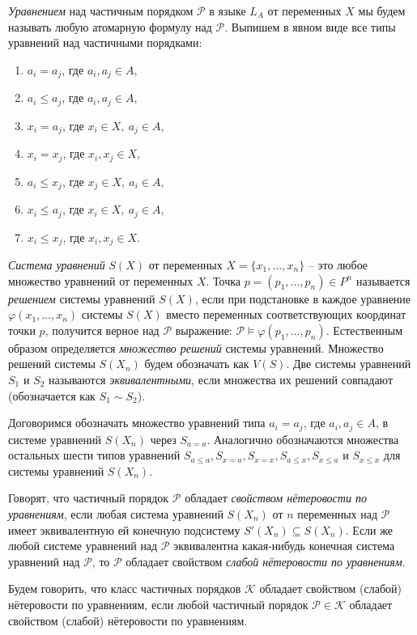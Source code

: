 \documentclass[12pt]{article}
\theoremstyle{break}
\def\P{\mathcal{P}}
\begin{document}
		\textit{Уравнением} над частичным порядком $\P$ в языке $L_A$ от переменных $X$ мы будем называть любую атомарную формулу над $\P$. Выпишем в явном виде все типы уравнений над частичными порядками:
		\begin{enumerate}
			\item $a_i=a_j$, где $a_i, a_j\in A$,
			\item $a_i\leqslant a_j$, где $a_i, a_j\in A$,
			\item $x_i=a_j$, где $x_i\in X,~a_j\in A$,
			\item $x_i=x_j$, где $x_i, x_j\in X$,
			\item $a_i\leqslant x_j$, где $x_j\in X,~a_i\in A$,
			\item $x_i\leqslant a_j$, где $x_i\in X,~a_j\in A$,
			\item $x_i\leqslant x_j$, где $x_i, x_j\in X$.
		\end{enumerate}

		\textit{Система уравнений} $S(X)$ от переменных $X=\{x_1,\dots,x_n\}$ -- это любое множество уравнений от переменных $X$. Точка $p=(p_1,\dots,p_n)\in P^n$ называется \textit{решением} системы уравнений $S(X)$, если при подстановке в каждое уравнение $\varphi(x_1,\dots,x_n)$ системы $S(X)$ вместо переменных соответствующих координат точки $p$, получится верное над $\P$ выражение: $\P\vDash \varphi(p_1,\dots,p_n)$. Естественным образом определяется \textit{множество решений} системы уравнений. Множество решений системы $S(X_n)$ будем обозначать как $V(S)$. Две системы уравнений $S_1$ и $S_2$ называются \textit{эквивалентными}, если множества их решений совпадают (обозначается как $S_1\sim S_2$).

		Договоримся обозначать множество уравнений типа $a_i=a_j$, где $a_i, a_j\in A$, в системе уравнений $S(X_n)$ через $S_{a=a}$. Аналогично обозначаются множества остальных шести типов уравнений $S_{a\leqslant a}, S_{x=a}, S_{x=x}, S_{a\leqslant x}, S_{x\leqslant a}$ и $ S_{x\leqslant x}$ для системы уравнений $S(X_n)$.
		
		Говорят, что частичный порядок $\P$ обладает \textit{свойством нётеровости по уравнениям}, если любая система уравнений $S(X_n)$ от $n$ переменных над $\P$ имеет эквивалентную ей конечную подсистему $S'(X_n) \subseteq S(X_n)$. Если же любой системе уравнений над $\P$ эквивалентна какая-нибудь конечная система уравнений над $\P$, то $\P$ обладает свойством \textit{слабой нётеровости по уравнениям}.
		
		Будем говорить, что класс частичных порядков $\mathcal{K}$ обладает свойством (слабой) нётеровости по уравнениям, если любой частичный порядок $\P \in \mathcal{K}$ обладает свойством (слабой) нётеровости по уравнениям.
		
\end{document}
